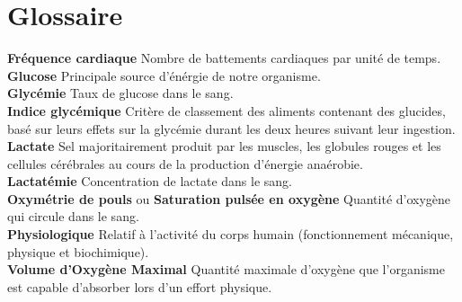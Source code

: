 \chapter*{Glossaire}
\label{chap:glossaire}


\textbf {Fréquence cardiaque} Nombre de battements cardiaques par unité de temps. \\


\textbf {Glucose} Principale source d'énérgie de notre organisme.\\

\textbf {Glycémie} Taux de glucose dans le sang.\\

\textbf {Indice glycémique} Critère de classement des aliments contenant des glucides, basé sur leurs effets sur la glycémie durant les deux heures suivant leur ingestion.\\

\textbf{Lactate} Sel majoritairement produit par les muscles, les globules rouges et les cellules cérébrales au cours de la production d’énergie anaérobie. \\

\textbf {Lactatémie} Concentration de lactate dans le sang. \\

\textbf {Oxymétrie de pouls} ou \textbf{Saturation pulsée en oxygène} Quantité d’oxygène qui circule dans le sang.\\

\textbf{Physiologique} Relatif à l'activité du corps humain (fonctionnement mécanique, physique et biochimique).\\ 

\textbf{Volume d’Oxygène Maximal} Quantité maximale d'oxygène que l'organisme est capable d'absorber lors d'un effort physique. \\ 


        

